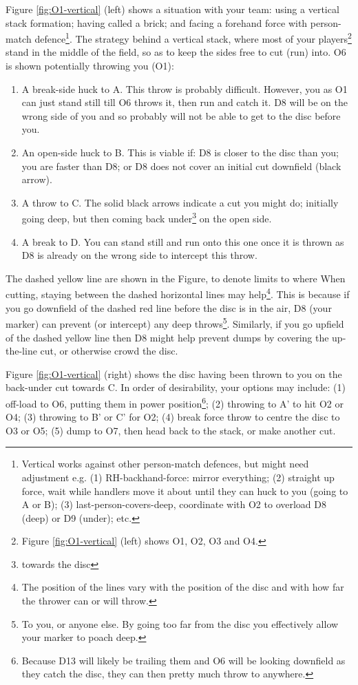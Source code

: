 \documentclass{tufte-handout}
\begin{document}
Figure \ref{fig:O1-vertical} (left) shows 
a situation 
with 
your team: 
using 
a vertical stack formation; 
having called a brick; and
facing a 
forehand force with 
person-match defence\footnote{
Vertical works
against other person-match defences, 
but might need 
adjustment e.g. 
(1) RH-backhand-force: mirror everything;
(2) straight up force, 
wait while handlers 
move it about 
until they can huck 
to you (going to A or B);
(3) last-person-covers-deep,
coordinate with O2 
to overload D8 (deep) 
or D9 (under); etc.}. 
The strategy behind 
a vertical stack, 
where most of your 
players\footnote{Figure \ref{fig:O1-vertical} (left)
shows O1, O2, O3 and O4.}  
stand in the middle of the field, 
so as to keep the sides free to 
cut (run) into. 
O6 is shown
potentially throwing 
you (O1):
\begin{enumerate}
\item A break-side 
huck to A.
This throw is 
probably 
difficult. 
However, you as O1
can just
stand still 
till O6 throws it, 
then run and catch it.
D8 will be on the wrong side of you
and so probably 
will not be able 
to get to the disc
before you.
\item An open-side huck to B. 
This is viable if: 
D8 is closer to the disc than you; 
you are faster than D8; or 
D8 does not cover 
an initial cut downfield (black arrow). 
\item A throw 
to C.
The solid black arrows indicate 
a cut you might do;
initially going deep,
but then coming back under\footnote{towards the disc}
on the open side. 
\item A break to D. 
You can stand still 
and run onto this one 
once it is thrown 
as D8 is already on 
the wrong side to intercept 
this throw. 
\end{enumerate}
The dashed yellow line are 
shown in the Figure, 
to denote limits to 
where When cutting,
staying  
between 
the dashed 
horizontal 
lines 
may help\footnote{ 
The position of 
the lines vary
with the position of the disc
and with how far the thrower  
can or will 
throw.}. 
This is because
if you go 
downfield of the dashed red line 
before the disc is in the air,
D8 (your marker) 
can prevent 
(or intercept)
any deep throws\footnote{
To you, 
or anyone else.
By going 
too far 
from the disc 
you 
effectively
allow your marker 
to poach deep.}.
Similarly, 
if you go 
upfield of the dashed yellow line
then D8 
might help
prevent dumps 
by covering 
the up-the-line cut, 
or otherwise crowd 
the disc. 

Figure \ref{fig:O1-vertical} (right) shows 
the disc having been thrown to you
on the back-under cut towards C. 
In order of desirability, 
your options may include: 
(1)
off-load to O6, 
putting them in power position\footnote{
Because D13 
will likely be trailing them 
and O6 
will be looking downfield 
as they catch the disc, 
they can
then pretty much 
throw to anywhere.};
(2) throwing to A' to hit O2 or O4;
(3) throwing to B' or C' for O2;
(4) break force throw 
to centre the disc
to O3 or O5;
(5) dump to O7, then
head back to the stack, 
or make another cut.
\end{document}
